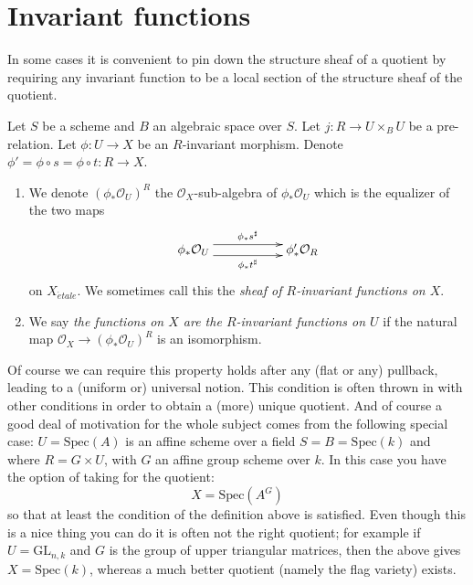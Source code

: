 \section{Invariant functions}
\label{section-functions}

\noindent
In some cases it is convenient to pin down the structure sheaf
of a quotient by requiring any invariant function to be a local
section of the structure sheaf of the quotient.

\begin{definition}
\label{definition-functions}
Let $S$ be a scheme and $B$ an algebraic space over $S$.
Let $j : R \to U \times_B U$ be a pre-relation.
Let $\phi : U \to X$ be an $R$-invariant morphism.
Denote $\phi' = \phi \circ s = \phi \circ t : R \to X$.
\begin{enumerate}
\item We denote $(\phi_*\mathcal{O}_U)^R$ the $\mathcal{O}_X$-sub-algebra
of $\phi_*\mathcal{O}_U$ which is the equalizer of the two maps
$$
\xymatrix{
\phi_*\mathcal{O}_U
\ar@<1ex>[rr]^{\phi_*s^\sharp}
\ar@<-1ex>[rr]_{\phi_*t^\sharp}
& &
\phi'_*\mathcal{O}_R
}
$$
on $X_{\acute{e}tale}$. We sometimes call this the
{\it sheaf of $R$-invariant functions on $X$}.
\item We say {\it the functions on $X$ are the $R$-invariant functions on
$U$} if the natural map $\mathcal{O}_X \to (\phi_*\mathcal{O}_U)^R$ 
is an isomorphism.
\end{enumerate}
\end{definition}

\noindent
Of course we can require this property holds after any (flat or any) pullback,
leading to a (uniform or) universal notion. This condition is often thrown in
with other conditions in order to obtain a (more) unique quotient. And of
course a good deal of motivation for the whole subject comes from the following
special case: $U = \text{Spec}(A)$ is an affine scheme over a field
$S = B = \text{Spec}(k)$ and where $R = G \times U$, with
$G$ an affine group scheme over $k$. In this case
you have the option of taking for the quotient:
$$
X = \text{Spec}(A^G)
$$
so that at least the condition of the definition above is satisfied.
Even though this is a nice thing you can do it is often not the right
quotient; for example if $U = \text{GL}_{n, k}$ and $G$ is the group of
upper triangular matrices, then the above gives $X = \text{Spec}(k)$, whereas
a much better quotient (namely the flag variety) exists.








